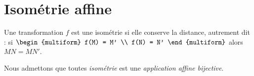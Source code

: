 \providecommand{\Id}{\mathrm{Id}}
\providecommand{\Droite}{(\mathscr{D})}
\providecommand{\DroiteU}{(\mathscr{D}_1)}
\providecommand{\DroiteD}{(\mathscr{D}_2)}
\providecommand{\Arg}[1]{\mathrm{Arg}\left(#1\right)}

\section{Isom\'etrie affine}
      \begin{defi}
            Une transformation $f$ est une isom\'etrie si elle conserve la distance, autrement dit :
            si 
            $ \begin{multiform}
                  f(M) = M' \\
                  f(N) = N'
            \end{multiform}      
            $
            alors 
            $MN = MN'$.
            
            Nous admettons que toutes \emph{isom\'etrie} est une \emph{application affine bijective}.
      \end{defi}
